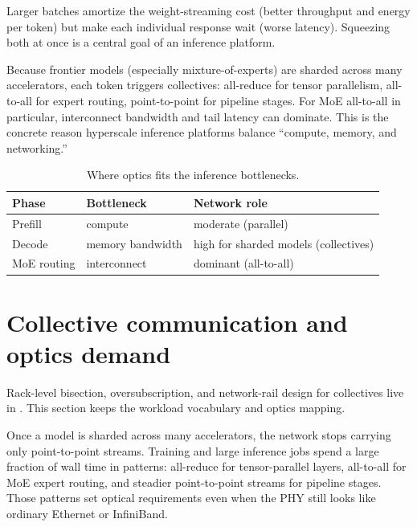  Larger batches amortize the
weight-streaming cost (better throughput and energy per token) but make each
individual response wait (worse latency). Squeezing both at once is a central goal
of an inference platform.

 Because frontier
models (especially mixture-of-experts) are sharded across many accelerators,
each token triggers collectives: all-reduce for tensor parallelism, all-to-all
for expert routing, point-to-point for pipeline stages. For MoE all-to-all in
particular, interconnect bandwidth and tail latency can dominate. This is the
concrete reason hyperscale inference platforms balance ``compute, memory, and
networking.''

\begin{table}[ht]
\centering
\caption{Where optics fits the inference bottlenecks.\label{tab:inference}}
\renewcommand{\arraystretch}{1.25}%
\begin{tabular}{@{}lll@{}}
\toprule
Phase & Bottleneck & Network role \\
\midrule
Prefill & compute & moderate (parallel) \\
\addlinespace[1.5em]
Decode & memory bandwidth & high for sharded models (collectives) \\
\addlinespace[1.5em]
MoE routing & interconnect & dominant (all-to-all) \\
\bottomrule
\end{tabular}
\end{table}

\section{Collective communication and optics demand}
\label{sec:collectives}

Rack-level bisection, oversubscription, and network-rail design for collectives
live in . This section keeps the workload vocabulary and optics
mapping.

Once a model is sharded across many accelerators, the network stops carrying only
point-to-point streams. Training and large inference jobs spend a large fraction
of wall time in  patterns: all-reduce for tensor-parallel layers,
all-to-all for MoE expert routing, and steadier point-to-point streams for pipeline
stages. Those patterns set optical requirements even when the PHY still looks like
ordinary Ethernet or InfiniBand.

